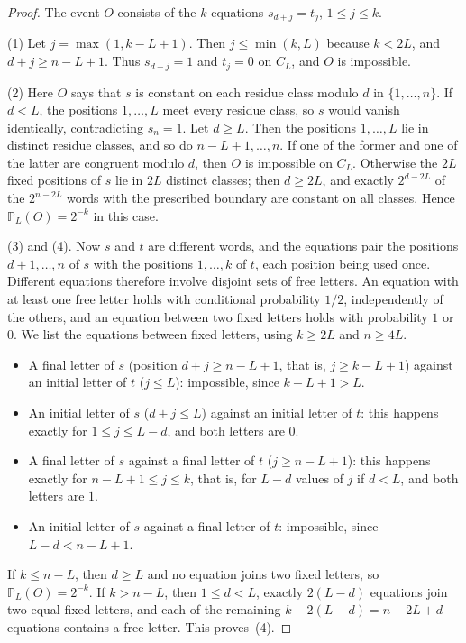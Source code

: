 \documentclass[11pt]{amsart}
\theoremstyle{remark}
\numberwithin{equation}{section}
\newcommand{\PP}{\mathbb{P}}
\begin{document}
\begin{proof}
The event $O$ consists of the $k$ equations $s_{d+j}=t_j$, $1\le j\le k$.

(1) Let $j=\max(1,k-L+1)$. Then $j\le\min(k,L)$ because $k<2L$, and $d+j\ge n-L+1$. Thus $s_{d+j}=1$ and $t_j=0$ on $C_L$, and $O$ is impossible.

(2) Here $O$ says that $s$ is constant on each residue class modulo $d$ in $\{1,\dots,n\}$. If $d<L$, the positions $1,\dots,L$ meet every residue class, so $s$ would vanish identically, contradicting $s_n=1$. Let $d\ge L$. Then the positions $1,\dots,L$ lie in distinct residue classes, and so do $n-L+1,\dots,n$. If one of the former and one of the latter are congruent modulo $d$, then $O$ is impossible on $C_L$. Otherwise the $2L$ fixed positions of $s$ lie in $2L$ distinct classes; then $d\ge2L$, and exactly $2^{d-2L}$ of the $2^{n-2L}$ words with the prescribed boundary are constant on all classes. Hence $\PP_L(O)=2^{-k}$ in this case.

(3) and (4). Now $s$ and $t$ are different words, and the equations pair the positions $d+1,\dots,n$ of $s$ with the positions $1,\dots,k$ of $t$, each position being used once. Different equations therefore involve disjoint sets of free letters. An equation with at least one free letter holds with conditional probability $1/2$, independently of the others, and an equation between two fixed letters holds with probability $1$ or $0$. We list the equations between fixed letters, using $k\ge2L$ and $n\ge4L$.
\begin{itemize}
\item A final letter of $s$ (position $d+j\ge n-L+1$, that is, $j\ge k-L+1$) against an initial letter of $t$ ($j\le L$): impossible, since $k-L+1>L$.
\item An initial letter of $s$ ($d+j\le L$) against an initial letter of $t$: this happens exactly for $1\le j\le L-d$, and both letters are $0$.
\item A final letter of $s$ against a final letter of $t$ ($j\ge n-L+1$): this happens exactly for $n-L+1\le j\le k$, that is, for $L-d$ values of $j$ if $d<L$, and both letters are $1$.
\item An initial letter of $s$ against a final letter of $t$: impossible, since $L-d<n-L+1$.
\end{itemize}
If $k\le n-L$, then $d\ge L$ and no equation joins two fixed letters, so $\PP_L(O)=2^{-k}$. If $k>n-L$, then $1\le d<L$, exactly $2(L-d)$ equations join two equal fixed letters, and each of the remaining $k-2(L-d)=n-2L+d$ equations contains a free letter. This proves~(4).
\end{proof}
\end{document}
